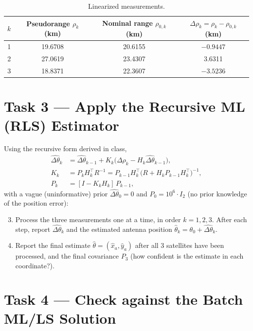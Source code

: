 \documentclass[11pt]{article}
\begin{document}
\begin{table}[h]
\centering
\caption{Linearized measurements.}
\label{tab:linearized}
\begin{tabular}{@{}cccc@{}}
\toprule
$k$ & Pseudorange $\rho_k$ (km) & Nominal range $\rho_{0,k}$ (km) & $\Delta\rho_k = \rho_k - \rho_{0,k}$ (km) \\
\midrule
1 & 19.6708 & 20.6155 & $-0.9447$ \\
2 & 27.0619 & 23.4307 & 3.6311 \\
3 & 18.8371 & 22.3607 & $-3.5236$ \\
\bottomrule
\end{tabular}
\end{table}

\section{Task 3 --- Apply the Recursive ML (RLS) Estimator}

Using the recursive form derived in class,
\begin{align}
  \hat{\Delta\theta}_k &= \hat{\Delta\theta}_{k-1} + K_k\big(\Delta\rho_k - H_k \hat{\Delta\theta}_{k-1}\big), \\
  K_k &= P_k H_k^\top R^{-1} = P_{k-1}H_k^\top\big(R + H_k P_{k-1}H_k^\top\big)^{-1}, \\
  P_k &= [I - K_k H_k]\,P_{k-1},
\end{align}
with a vague (uninformative) prior $\hat{\Delta\theta}_0 = 0$ and $P_0 = 10^6 \cdot I_2$ (no prior
knowledge of the position error):

\begin{enumerate}[leftmargin=2.2em]
\setcounter{enumi}{2}
\item Process the three measurements one at a time, in order $k=1,2,3$. After each step, report
      $\hat{\Delta\theta}_k$ and the estimated antenna position $\hat\theta_k = \theta_0 + \hat{\Delta\theta}_k$.
\item Report the final estimate $\hat\theta = (\hat x_a, \hat y_a)$ after all 3 satellites have been
      processed, and the final covariance $P_3$ (how confident is the estimate in each coordinate?).
\end{enumerate}

\section{Task 4 --- Check against the Batch ML/LS Solution}
\end{document}
